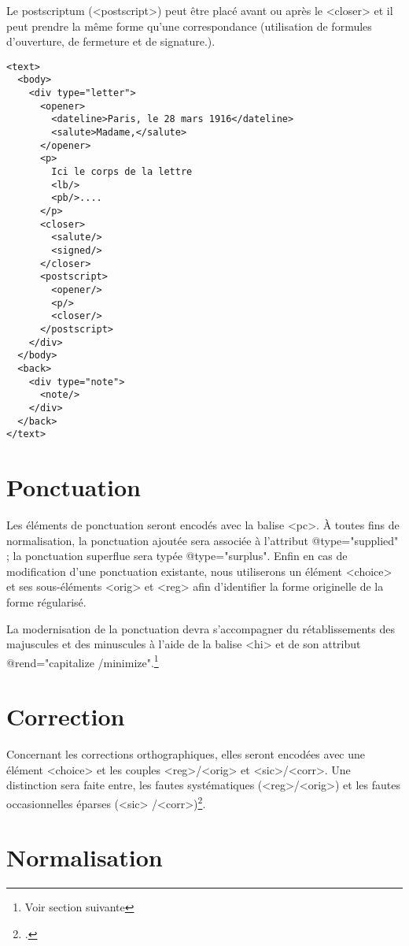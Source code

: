 \documentclass[12pt,a4paper,oneside]{book} %
\begin{document}
Le postscriptum (<postscript>) peut être placé avant ou après le <closer> et il peut prendre la même forme qu'une correspondance (utilisation de formules d'ouverture, de fermeture et de signature.).

\lstset{language=XML}
\begin{lstlisting}
<text>
  <body>
    <div type="letter">
      <opener>
        <dateline>Paris, le 28 mars 1916</dateline>
        <salute>Madame,</salute>
      </opener>
      <p>
        Ici le corps de la lettre
        <lb/>
        <pb/>....
      </p>
      <closer>
        <salute/>
        <signed/>
      </closer>
      <postscript>
        <opener/>
        <p/>
        <closer/>
      </postscript>
    </div>
  </body>
  <back>
    <div type="note">
      <note/>
    </div>
  </back>
</text>
\end{lstlisting}
\pagebreak

\section*{Ponctuation}
 
Les éléments de ponctuation seront encodés avec la balise <pc>. À toutes fins de normalisation, la ponctuation ajoutée sera associée à l'attribut @type="supplied" ; la ponctuation superflue sera typée @type="surplus". Enfin en cas de modification d'une ponctuation existante, nous utiliserons un élément <choice> et ses sous-éléments <orig> et <reg> afin d'identifier la forme originelle de la forme régularisé.
\bigskip 

La modernisation de la ponctuation devra s'accompagner du rétablissements des majuscules et des minuscules à l'aide de la balise <hi> et de son attribut @rend="capitalize /minimize".\footnote{Voir section suivante}

\section*{Correction}

Concernant les corrections orthographiques, elles seront encodées avec une élément <choice> et les couples <reg>/<orig> et <sic>/<corr>. Une distinction sera faite entre, les fautes systématiques (<reg>/<orig>) et les fautes occasionnelles éparses (<sic> /<corr>)\footcite{nougaret_ledition_2015}.

\section*{Normalisation}
 
\end{document}
